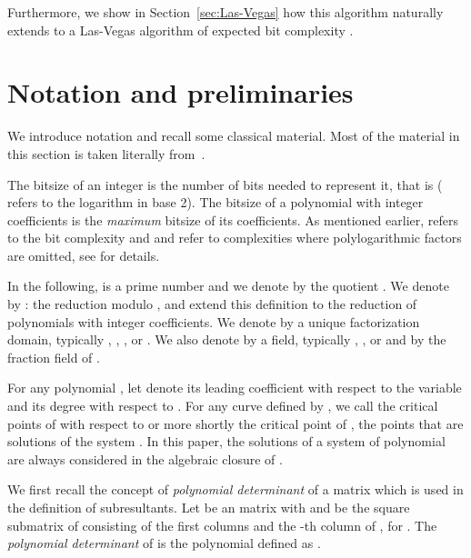 \documentclass{sig-alternate}
\newcommand{\blue}[1]{\color{blue}#1\color{black}\xspace}
\renewcommand{\blue}[1]{#1\xspace}
\begin{document}
\blue{Furthermore, we show in Section~\ref{sec:Las-Vegas} how this algorithm naturally extends to a Las-Vegas algorithm of
  expected bit complexity .}









\section{Notation and preliminaries}\label{sec:prelim}






We introduce notation and recall some classical material. Most of the material in this section is
taken literally from~\blue{\cite{bouzidiJSC2014a}}. 

 The bitsize of an integer  is the number of bits needed to represent it, that
is  ( refers to the logarithm in base 2). 
The bitsize of a polynomial with integer
coefficients is the \emph{maximum} bitsize of its coefficients. As mentioned
earlier,  refers to the bit complexity and  and  refer to
complexities where polylogarithmic factors are omitted, see \cite[Def.
25.8]{vzGGer2} for details. 




In the following,  is a prime number and we denote by  the quotient
.  We denote by :  the reduction
modulo , and extend this definition to the reduction of polynomials with
integer coefficients.  We denote by  a unique factorization domain,
typically , , ,  or . We also denote by
  a field, typically , , or  and by
  the fraction field of .

For any polynomial , let  denote its leading coefficient
with respect to the variable  and
 its degree with respect to .
For any curve defined by , we call the critical points of  with respect to  or more shortly the critical point of , the points that are solutions of the system .
In this paper, 
the solutions of a system of polynomial are always considered in the algebraic closure of
. 


\smallskip
{}\quad
We first recall the concept of
\emph{polynomial determinant} of a matrix which is used in the definition of subresultants.
Let  be an  matrix with  and  be the square submatrix of  consisting of the first  columns
and the -th column of , for . The \emph{polynomial determinant} of  is the polynomial
defined as .
\end{document}
